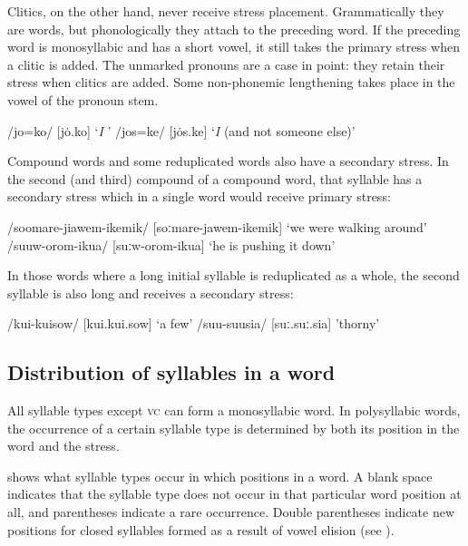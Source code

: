 Clitics, on the other hand, never receive stress placement. Grammatically they are words, but phonologically they attach to the preceding word. If the preceding word is monosyllabic and has a short vowel, it still takes the primary stress when a clitic is added. The unmarked pronouns are a case in point: they retain their stress when clitics are added. Some non-phonemic lengthening takes place in the vowel of the pronoun stem.

\ea
\ea
/jo=ko/  [{{\textprimstress}}jo{\.{}.ko}]  `\textit{I} '
\ex
/jos=ke/  [{{\textprimstress}}jo{\.{}s.ke}]  `\textit{I} (and not someone else)' 
\z
\z

Compound words and some reduplicated words also have a secondary stress.  In the second (and third) compound of a compound word, that syllable has a secondary stress which in a single word would receive primary stress: 

\ea
\ea
/soomare-jiawem-ikemik/  [{{\textprimstress}soːmare-j}{\textsci}{{\textprimstress}}{{\textprimstress}}awem-i{{\textprimstress}}{{\textprimstress}}kemik]  `we were walking around'
\ex
/suuw-orom-ikua/  [{{\textprimstress}}suːw-o{{\textprimstress}}{{\textprimstress}}rom-i{{\textprimstress}}{{\textprimstress}}kua]  `he is pushing it down'
\z
\z

In those words where a long initial syllable is reduplicated as a whole, the second syllable is also long and receives a secondary stress:

\ea
\ea
/kui-kuisow/  [{{\textprimstress}}kui.{{\textprimstress}}{{\textprimstress}}kui.sow]  `a few'
\ex
/suu-suusia/  [{{\textprimstress}}suː.{{\textprimstress}}{{\textprimstress}}suː.sia]  'thorny'
\z
\z

\subsection{Distribution of syllables in a word}\label{sec:2.3.2}

All syllable types except  \textsc{vc} can form a monosyllabic word. In polysyllabic words, the occurrence of a certain syllable type is determined by both its position in the word and the stress. 

 shows what syllable types occur in which positions in a word.  A blank space indicates that the syllable type does not occur in that particular word position at all, and parentheses indicate a rare occurrence. Double parentheses indicate new positions for closed syllables formed as a result of vowel elision (see ). 



